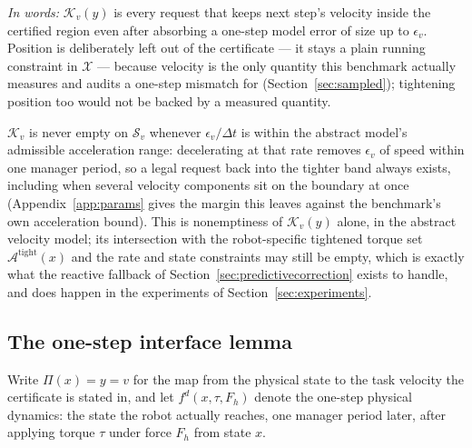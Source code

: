 \documentclass[journal]{IEEEtran}
\begin{document}
\emph{In words:} $\mathcal K_v(y)$ is every request that keeps next step's velocity inside the certified region even after absorbing a one-step model error of size up to $\epsilon_v$. Position is deliberately left out of the certificate --- it stays a plain running constraint in $\mathcal X$ --- because velocity is the only quantity this benchmark actually measures and audits a one-step mismatch for (Section~\ref{sec:sampled}); tightening position too would not be backed by a measured quantity.

$\mathcal K_v$ is never empty on $\mathcal S_v$ whenever $\epsilon_v/\Delta t$ is within the abstract model's admissible acceleration range: decelerating at that rate removes $\epsilon_v$ of speed within one manager period, so a legal request back into the tighter band always exists, including when several velocity components sit on the boundary at once (Appendix~\ref{app:params} gives the margin this leaves against the benchmark's own acceleration bound). This is nonemptiness of $\mathcal K_v(y)$ alone, in the abstract velocity model; its intersection with the robot-specific tightened torque set $\mathcal A^{\mathrm{tight}}(x)$ and the rate and state constraints may still be empty, which is exactly what the reactive fallback of Section~\ref{sec:predictivecorrection} exists to handle, and does happen in the experiments of Section~\ref{sec:experiments}.

\subsection{The one-step interface lemma}

Write $\Pi(x)=y=v$ for the map from the physical state to the task velocity the certificate is stated in, and let $f^d(x,\tau,F_h)$ denote the one-step physical dynamics: the state the robot actually reaches, one manager period later, after applying torque $\tau$ under force $F_h$ from state $x$.
\end{document}
